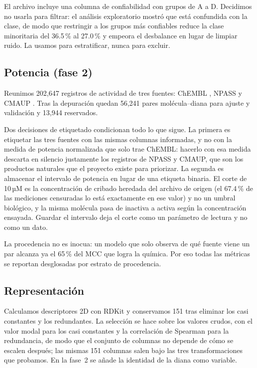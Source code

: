 \documentclass[twocolumn,10pt,letterpaper]{article}
\begin{document}
El archivo incluye una columna de confiabilidad con grupos de A a D. Decidimos no usarla para filtrar: el análisis exploratorio mostró que está confundida con la clase, de modo que restringir a los grupos más confiables reduce la clase minoritaria del 36.5\,\% al 27.0\,\% y empeora el desbalance en lugar de limpiar ruido. La usamos para estratificar, nunca para excluir.

\subsection{Potencia (fase 2)}

Reunimos 202,647 registros de actividad de tres fuentes: ChEMBL \autocite{zdrazil2024chembl}, NPASS \autocite{zhao2023npass,lin2026npass} y CMAUP \autocite{hou2024cmaup}. Tras la depuración quedan 56,241 pares molécula--diana para ajuste y validación y 13,944 reservados.

Dos decisiones de etiquetado condicionan todo lo que sigue. La primera es etiquetar las tres fuentes con las mismas columnas informadas, y no con la medida de potencia normalizada que solo trae ChEMBL: hacerlo con esa medida descarta en silencio justamente los registros de NPASS y CMAUP, que son los productos naturales que el proyecto existe para priorizar. La segunda es almacenar el intervalo de potencia en lugar de una etiqueta binaria. El corte de 10\,µM es la concentración de cribado heredada del archivo de origen (el 67.4\,\% de las mediciones censuradas lo está exactamente en ese valor) y no un umbral biológico, y la misma molécula pasa de inactiva a activa según la concentración ensayada. Guardar el intervalo deja el corte como un parámetro de lectura y no como un dato.

La procedencia no es inocua: un modelo que solo observa de qué fuente viene un par alcanza ya el 65\,\% del MCC que logra la química. Por eso todas las métricas se reportan desglosadas por estrato de procedencia.

\subsection{Representación}

Calculamos descriptores 2D con RDKit \autocite{rdkit} y conservamos 151 tras eliminar los casi constantes y los redundantes. La selección se hace sobre los valores crudos, con el valor modal para los casi constantes y la correlación de Spearman para la redundancia, de modo que el conjunto de columnas no depende de cómo se escalen después; las mismas 151 columnas salen bajo las tres transformaciones que probamos. En la fase~2 se añade la identidad de la diana como variable.
\end{document}
